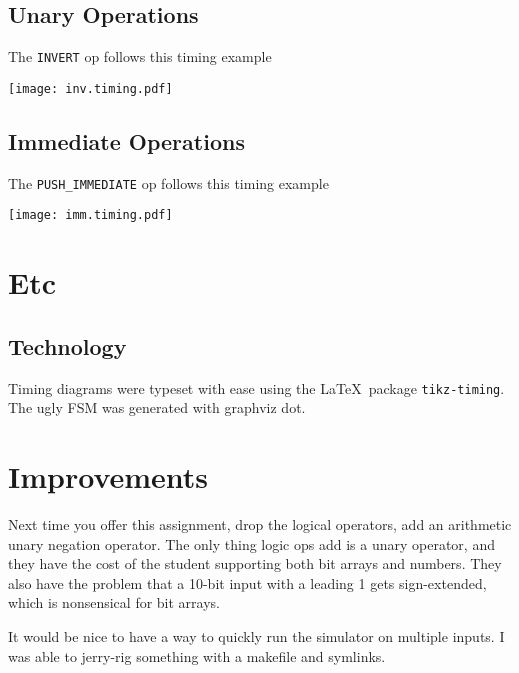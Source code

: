 \documentclass{article}
\begin{document}
\subsection{Unary Operations}
The \verb'INVERT' op follows this timing example
\begin{center}
\texttt{[image: inv.timing.pdf]}
\end{center}

\subsection{Immediate Operations}
The \verb'PUSH_IMMEDIATE' op follows this timing example
\begin{center}
\texttt{[image: imm.timing.pdf]}
\end{center}

\section{Etc}
\subsection{Technology}
Timing diagrams were typeset with ease using the \LaTeX\ package \verb'tikz-timing'.
The ugly FSM was generated with graphviz dot.
\section{Improvements}
Next time you offer this assignment, drop the logical operators, add an arithmetic unary negation operator.
The only thing logic ops add is a unary operator, and they have the cost of the student supporting both bit arrays and numbers.
They also have the problem that a 10-bit input with a leading 1 gets sign-extended, which is nonsensical for bit arrays.

It would be nice to have a way to quickly run the simulator on multiple inputs.
I was able to jerry-rig something with a makefile and symlinks.
\end{document}
